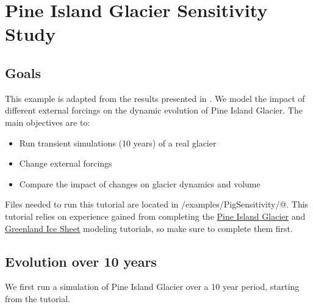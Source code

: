 \section{Pine Island Glacier Sensitivity Study}
\subsection{Goals} %
This example is adapted from the results presented in \cite{Seroussi2014}. We model the impact of different external forcings on the dynamic evolution of Pine Island Glacier. The main objectives are to:
\begin{itemize}
	\item Run transient simulations (10 years) of a real glacier
	\item Change external forcings
	\item Compare the impact of changes on glacier dynamics and volume
\end{itemize}

Files needed to run this tutorial are located in \verb@trunk/examples/PigSensitivity/@. This tutorial relies on experience gained from completing the \href{http://issm.jpl.nasa.gov/documentation/tutorials/pig}{Pine Island Glacier} and \href{http://issm.jpl.nasa.gov/documentation/tutorials/greenland}{Greenland Ice Sheet} modeling tutorials, so make sure to complete them first.
\subsection{Evolution over 10 years}%
We first run a simulation of Pine Island Glacier over a 10 year period, starting from the \verb@Pig@ tutorial.


